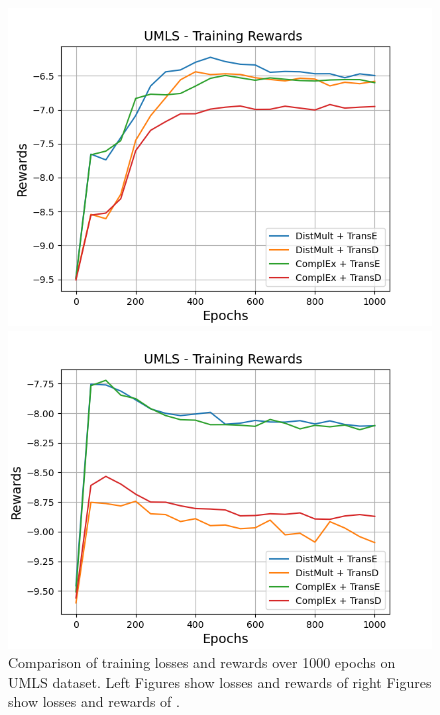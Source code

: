 \begin{figure}
\begin{minipage}{.5\textwidth}
    \end{minipage}
    \begin{minipage}{.5\textwidth}
      \centering
      \includegraphics[width=0.9\linewidth]{figures/results/gan_train/not_pretrained/random/umls/random_umls_rew.png}
    \end{minipage}%
    \begin{minipage}{.5\textwidth}
      \centering
      \includegraphics[width=0.9\linewidth]{figures/results/gan_train/not_pretrained/uncertainty/max_distribution/entropy/umls/uncertainty_umls_rew.png}
    \end{minipage}%
    \caption{Comparison of training losses and rewards over 1000 epochs on \textsc{UMLS} dataset.
    Left Figures show losses and rewards of \origsamplingand right Figures show losses and rewards of \ussoftmax.}
    \label{fig:advtrain_umls_losses_rewards}
\end{figure}
